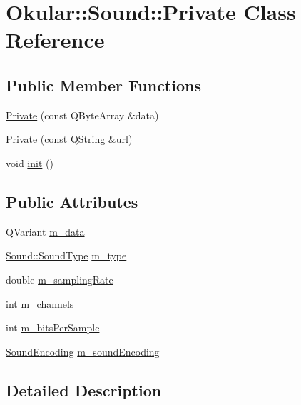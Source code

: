\hypertarget{classSound_1_1Private}{\section{Okular\+:\+:Sound\+:\+:Private Class Reference}
\label{classSound_1_1Private}
}
\subsection*{Public Member Functions}
\begin{DoxyCompactItemize}
\item 
\hyperlink{classSound_1_1Private_aee693f6492101d136aeecc84775d9515}{Private} (const Q\+Byte\+Array \&data)
\item 
\hyperlink{classSound_1_1Private_a6bb8bf159f875721e68c5fb7b67b9153}{Private} (const Q\+String \&url)
\item 
void \hyperlink{classSound_1_1Private_a926353b1a38540779877b9952aad5b35}{init} ()
\end{DoxyCompactItemize}
\subsection*{Public Attributes}
\begin{DoxyCompactItemize}
\item 
Q\+Variant \hyperlink{classSound_1_1Private_a7768921bd907eb0ae58ef9b91f611402}{m\+\_\+data}
\item 
\hyperlink{classOkular_1_1Sound_aed586d1d0455f4309b1309b9954d5c04}{Sound\+::\+Sound\+Type} \hyperlink{classSound_1_1Private_ab2ddecacdbe04eb2b02a7cea13772fe3}{m\+\_\+type}
\item 
double \hyperlink{classSound_1_1Private_af993ccbc2dd61db92380c8f2bbc6bcef}{m\+\_\+sampling\+Rate}
\item 
int \hyperlink{classSound_1_1Private_abcbbdf5cfd47dd247f6e3bd76c16c94c}{m\+\_\+channels}
\item 
int \hyperlink{classSound_1_1Private_aa35884bcd27d7d5c440375133d364b5a}{m\+\_\+bits\+Per\+Sample}
\item 
\hyperlink{classOkular_1_1Sound_a4bc04dce6aa25c5aadb2f93d0fafe5f8}{Sound\+Encoding} \hyperlink{classSound_1_1Private_a4649c67a57652889674af514a94fb73d}{m\+\_\+sound\+Encoding}
\end{DoxyCompactItemize}


\subsection{Detailed Description}


